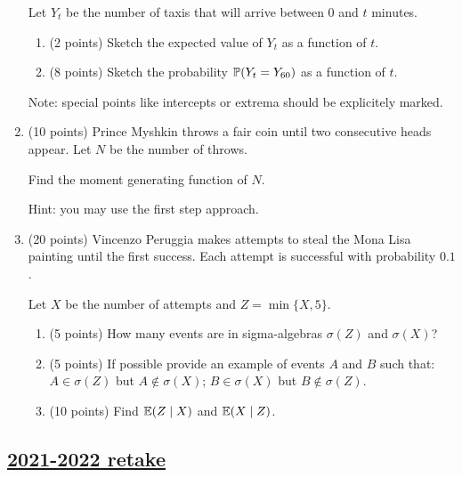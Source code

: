 \begin{enumerate}
Let $Y_t$ be the number of taxis that will arrive between 0 and $t$ minutes.

\begin{enumerate}
  \item (2 points) Sketch the expected value of $Y_t$ as a function of $t$.
  \item (8 points) Sketch the probability $\P(Y_t = Y_{60})$ as a function of $t$.
\end{enumerate}

Note: special points like intercepts or extrema should be explicitely marked.

\item (10 points) Prince Myshkin throws a fair coin until two consecutive heads appear. 
Let $N$ be the number of throws. 

Find the moment generating function of $N$. 

Hint: you may use the first step approach.

\item (20 points) Vincenzo Peruggia makes attempts to steal the Mona Lisa painting until the first 
success. 
Each attempt is successful with probability $0.1$.

Let $X$ be the number of attempts and $Z = \min\{X, 5\}$.

\begin{enumerate}
  \item (5 points) How many events are in sigma-algebras $\sigma(Z)$ and $\sigma(X)$?
  \item (5 points) If possible provide an example of events $A$ and $B$ such that: $A\in \sigma(Z)$ but $A\not\in\sigma(X)$; $B\in \sigma(X)$ but $B\not\in\sigma(Z)$.
  \item (10 points) Find $\E(Z \mid X)$ and $\E(X \mid Z)$.
\end{enumerate}






\end{enumerate}



\subsection[2021-2022 retake]{\hyperref[sec:sol_kr_01_2021_2022_retake]{2021-2022 retake}}
\label{sec:kr_01_2021_2022_retake} %


